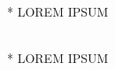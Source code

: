 \begin{boxD}
	\begin{exmp}\mbox{}\\*
		{\color{red} LOREM IPSUM}

	\end{exmp}
\end{boxD}

\begin{boxD}
	\begin{exmp}\mbox{}\\*
		{\color{red} LOREM IPSUM}
	\end{exmp}
\end{boxD}

